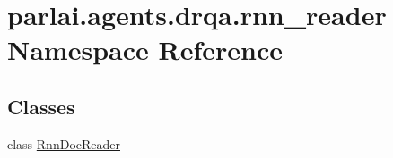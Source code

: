 \hypertarget{namespaceparlai_1_1agents_1_1drqa_1_1rnn__reader}{}\section{parlai.\+agents.\+drqa.\+rnn\+\_\+reader Namespace Reference}
\label{namespaceparlai_1_1agents_1_1drqa_1_1rnn__reader}
\subsection*{Classes}
\begin{DoxyCompactItemize}
\item 
class \hyperlink{classparlai_1_1agents_1_1drqa_1_1rnn__reader_1_1RnnDocReader}{Rnn\+Doc\+Reader}
\end{DoxyCompactItemize}
